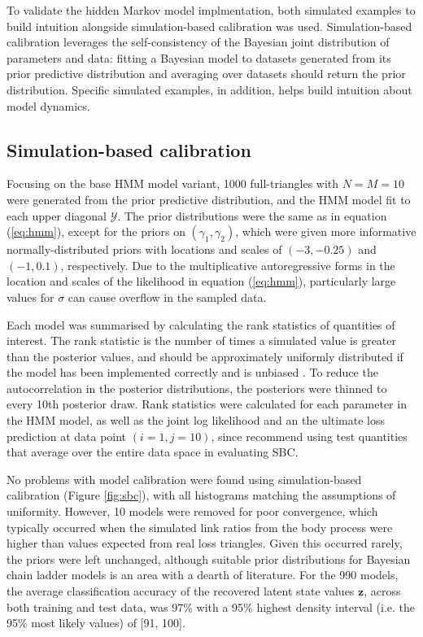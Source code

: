 To validate the hidden Markov model implmentation, 
both simulated examples
to build intuition alongside
simulation-based calibration \citep{talts2018,modrak2023}
was used.
Simulation-based calibration leverages the self-consistency
of the Bayesian joint distribution of parameters and
data: fitting a Bayesian model to datasets generated
from its prior predictive distribution and averaging 
over datasets should return the prior distribution.
Specific simulated examples, in addition, helps
build intuition about model dynamics.

\subsection{Simulation-based calibration}
Focusing on the base HMM model variant, 1000 
full-triangles with $N = M = 10$ were generated
from the prior predictive distribution, and the
HMM model fit to each upper diagonal $\mathcal{Y}$.
The prior distributions were the same as in
equation (\ref{eq:hmm}), except for the priors
on $(\gamma_{1}, \gamma_{2})$, which were 
given more informative normally-distributed priors
with locations and scales of $(-3, -0.25)$ and
$(-1, 0.1)$, respectively. Due to the
multiplicative autoregressive forms in the
location and scales of the likelihood in
equation (\ref{eq:hmm}), particularly
large values for $\sigma$ can cause overflow
in the sampled data.

Each model was summarised by
calculating the rank statistics of quantities
of interest.
The rank statistic is the number of times a
simulated value is greater than the posterior values,
and should be approximately uniformly distributed
if the model has been implemented correctly and is
unbiased \citep{talts2018}. To reduce the autocorrelation
in the posterior distributions, the posteriors were
thinned to every 10th posterior draw.
Rank statistics
were calculated for each parameter in the HMM model,
as well as the joint log likelihood and
an the ultimate loss prediction at data point
$(i=1, j=10)$, since \cite{modrak2023} recommend
using test quantities that average over the entire
data space in evaluating SBC.

No problems with model calibration were found using simulation-based
calibration (Figure \ref{fig:sbc}),
with all histograms matching the assumptions of
uniformity. However, 10 models were removed for poor
convergence, which typically occurred when the simulated
link ratios from the body process were
higher than values expected from real loss triangles. 
Given this occurred rarely, the priors were left
unchanged, although suitable prior distributions
for Bayesian chain ladder models is an area
with a dearth of literature.
For the 990 models, 
the average classification accuracy of the recovered latent
state values $\bm{z}$, across
both training and test data, was 97\% with a 
95\% highest density interval (i.e. the 95\% most
likely values) of [91, 100].

